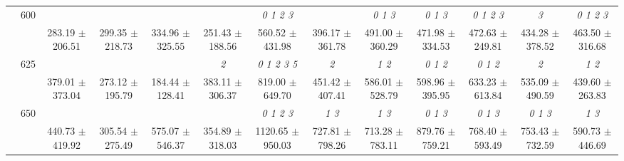\begin{table}[h]
{\begin{tabular}{
        ccccccccccccc}
 & \multirow{2}{*}{600}& & & & & \textit{ 0 1 2 3 }& & \textit{ 0 1 3 }& \textit{ 0 1 3 }& \textit{ 0 1 2 3 }& \textit{ 3 }& \textit{ 0 1 2 3 } \\ 
 & & 283.19 $\pm$ 206.51& 299.35 $\pm$ 218.73& 334.96 $\pm$ 325.55& 251.43 $\pm$ 188.56& 560.52 $\pm$ 431.98& 396.17 $\pm$ 361.78& 491.00 $\pm$ 360.29& 471.98 $\pm$ 334.53& 472.63 $\pm$ 249.81& 434.28 $\pm$ 378.52& 463.50 $\pm$ 316.68 \\ 
 & \multirow{2}{*}{625}& \cellcolor[HTML]{EFEFEF} & \cellcolor[HTML]{EFEFEF} & \cellcolor[HTML]{EFEFEF} & \cellcolor[HTML]{EFEFEF} \textit{ 2 }& \cellcolor[HTML]{EFEFEF} \textit{ 0 1 2 3 5 }& \cellcolor[HTML]{EFEFEF} \textit{ 2 }& \cellcolor[HTML]{EFEFEF} \textit{ 1 2 }& \cellcolor[HTML]{EFEFEF} \textit{ 0 1 2 }& \cellcolor[HTML]{EFEFEF} \textit{ 0 1 2 }& \cellcolor[HTML]{EFEFEF} \textit{ 2 }& \cellcolor[HTML]{EFEFEF} \textit{ 1 2 } \\ 
 & & \cellcolor[HTML]{EFEFEF} 379.01 $\pm$ 373.04& \cellcolor[HTML]{EFEFEF} 273.12 $\pm$ 195.79& \cellcolor[HTML]{EFEFEF} 184.44 $\pm$ 128.41& \cellcolor[HTML]{EFEFEF} 383.11 $\pm$ 306.37& \cellcolor[HTML]{EFEFEF} 819.00 $\pm$ 649.70& \cellcolor[HTML]{EFEFEF} 451.42 $\pm$ 407.41& \cellcolor[HTML]{EFEFEF} 586.01 $\pm$ 528.79& \cellcolor[HTML]{EFEFEF} 598.96 $\pm$ 395.95& \cellcolor[HTML]{EFEFEF} 633.23 $\pm$ 613.84& \cellcolor[HTML]{EFEFEF} 535.09 $\pm$ 490.59& \cellcolor[HTML]{EFEFEF} 439.60 $\pm$ 263.83 \\ 
 & \multirow{2}{*}{650}& & & & & \textit{ 0 1 2 3 }& \textit{ 1 3 }& \textit{ 1 3 }& \textit{ 0 1 3 }& \textit{ 0 1 3 }& \textit{ 0 1 3 }& \textit{ 1 3 } \\ 
 & & 440.73 $\pm$ 419.92& 305.54 $\pm$ 275.49& 575.07 $\pm$ 546.37& 354.89 $\pm$ 318.03& 1120.65 $\pm$ 950.03& 727.81 $\pm$ 798.26& 713.28 $\pm$ 783.11& 879.76 $\pm$ 759.21& 768.40 $\pm$ 593.49& 753.43 $\pm$ 732.59& 590.73 $\pm$ 446.69 \\ \midrule 

        \bottomrule
        \end{tabular}%
        }

        \end{table}
        
